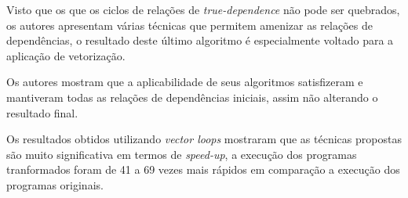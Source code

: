 Visto que os que os ciclos de relações de \textit{true-dependence} não pode ser
quebrados, os autores apresentam várias técnicas que permitem amenizar as
relações de dependências, o resultado deste último algoritmo é especialmente
voltado para a aplicação de vetorização.

Os autores mostram que a aplicabilidade de seus algoritmos satisfizeram e
mantiveram todas as relações de dependências iniciais, assim não alterando o 
resultado final.

Os resultados obtidos utilizando \textit{vector loops} mostraram que as técnicas
propostas são muito significativa em termos de \textit{speed-up}, a execução dos 
programas tranformados foram de 41 a 69 vezes mais rápidos em comparação a execução
dos programas originais.





